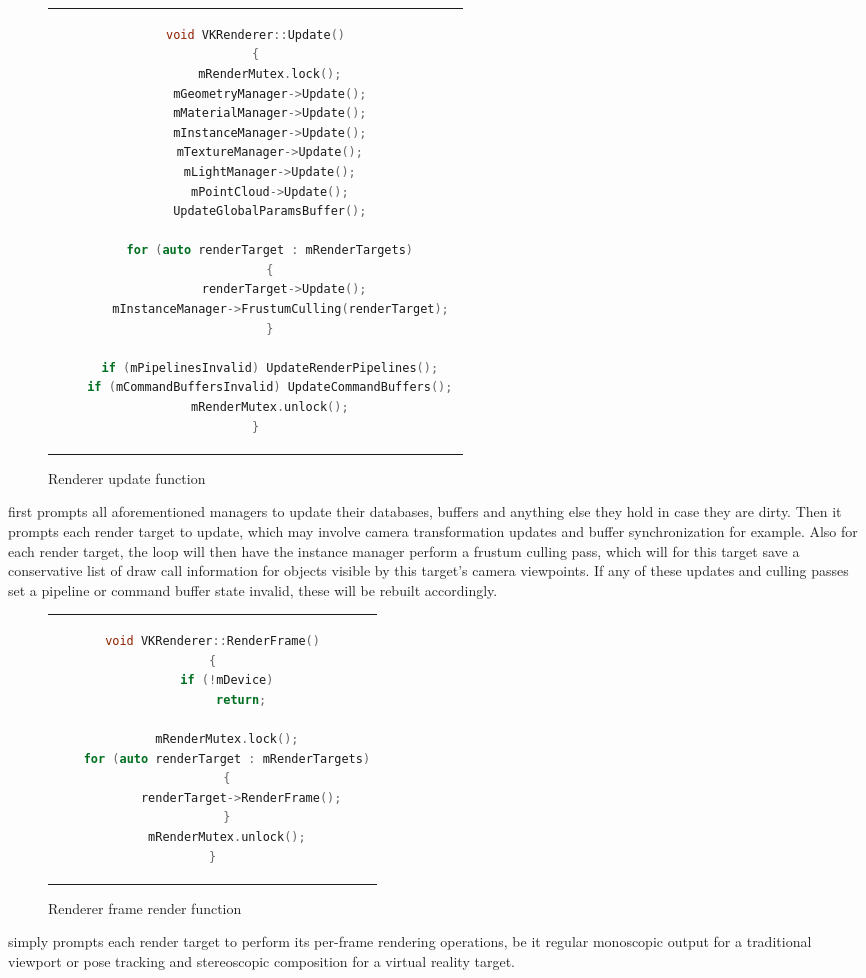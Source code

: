 \begin{figure}[htb]
  \centering
  \begin{tabular}{c}
  \begin{lstlisting}[language=C++]
void VKRenderer::Update()
{
	mRenderMutex.lock();
	mGeometryManager->Update();
	mMaterialManager->Update();
	mInstanceManager->Update();
	mTextureManager->Update();
	mLightManager->Update();
	mPointCloud->Update();
	UpdateGlobalParamsBuffer();

	for (auto renderTarget : mRenderTargets)
	{
		renderTarget->Update();
		mInstanceManager->FrustumCulling(renderTarget); 
	}

	if (mPipelinesInvalid) UpdateRenderPipelines();
	if (mCommandBuffersInvalid) UpdateCommandBuffers();
	mRenderMutex.unlock();
}
  \end{lstlisting}
  \end{tabular}
  \caption[VKRenderer's Update]{Renderer update function}\label{fig:lst_VKRenderer_Update}
\end{figure}

 first prompts all aforementioned managers to update their databases, buffers and anything else they hold in case they are dirty. Then it prompts each render target to update, which may involve camera transformation updates and buffer synchronization for example. Also for each render target, the loop will then have the instance manager perform a frustum culling pass, which will for this target save a conservative list of draw call information for objects visible by this target's camera viewpoints. 
If any of these updates and culling passes set a pipeline or command buffer state invalid, these will be rebuilt accordingly.  

\begin{figure}[htb]
  \centering
  \begin{tabular}{c}
  \begin{lstlisting}[language=C++]
void VKRenderer::RenderFrame()
{
	if (!mDevice)
		return;

	mRenderMutex.lock();
	for (auto renderTarget : mRenderTargets)
	{
		renderTarget->RenderFrame();
	}
	mRenderMutex.unlock();
}
	\end{lstlisting}
  \end{tabular}
  \caption[VKRenderer's RenderFrame]{Renderer frame render function}\label{fig:lst_VKRenderer_RenderFrame}
\end{figure}

 simply prompts each render target to perform its per-frame rendering operations, be it regular monoscopic output for a traditional viewport or pose tracking and stereoscopic composition for a virtual reality target. 

